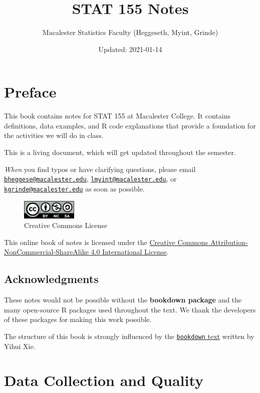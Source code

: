 \documentclass[
]{book}
\title{STAT 155 Notes}
\author{Macalester Statistics Faculty (Heggeseth, Myint, Grinde)}
\date{Updated: 2021-01-14}
\begin{document}
\maketitle

{
\setcounter{tocdepth}{2}
\tableofcontents
}
\hypertarget{preface}{%
\chapter*{Preface}\label{preface}}


This book contains notes for STAT 155 at Macalester College. It contains definitions, data examples, and R code explanations that provide a foundation for the activities we will do in class.

This is a living document, which will get updated throughout the semester.

\emph{When} you find typos or have clarifying questions, please email \href{mailto:bheggese@macalester.edu}{\nolinkurl{bheggese@macalester.edu}}, \href{mailto:lmyint@macalester.edu}{\nolinkurl{lmyint@macalester.edu}}, or \href{mailto:kgrinde@macalester.edu}{\nolinkurl{kgrinde@macalester.edu}} as soon as possible.

\begin{figure}
\centering
\includegraphics[width=1.04167in,height=\textheight]{Photos/by-nc-sa.png}
\caption{Creative Commons License}
\end{figure}

This online book of notes is licensed under the \href{http://creativecommons.org/licenses/by-nc-sa/4.0/}{Creative Commons Attribution-NonCommercial-ShareAlike 4.0 International License}.

\hypertarget{acknowledgments}{%
\section*{Acknowledgments}\label{acknowledgments}}


These notes would not be possible without the \textbf{bookdown package} and the many open-source R packages used throughout the text. We thank the developers of these packages for making this work possible.

The structure of this book is strongly influenced by the \href{https://bookdown.org/yihui/bookdown}{\texttt{bookdown} text} written by Yihui Xie.

\hypertarget{data-collection-and-quality}{%
\chapter{Data Collection and Quality}\label{data-collection-and-quality}}
\end{document}
